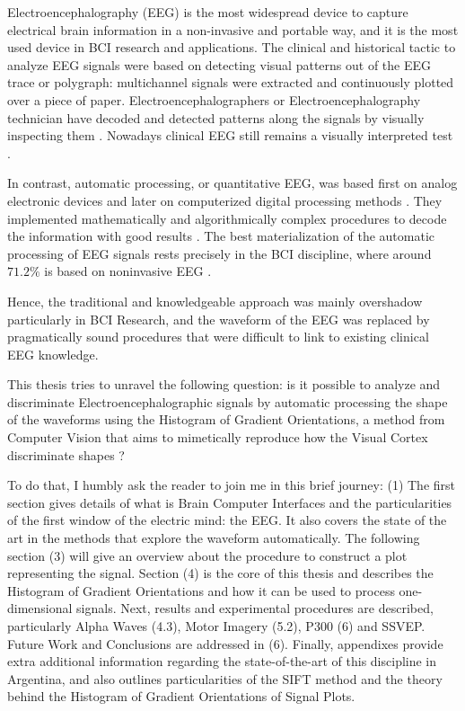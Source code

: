 Electroencephalography (EEG) is the most widespread device to capture electrical brain information in a non-invasive and portable way, and it is the most used device in BCI research and applications.  The clinical and historical tactic to analyze EEG signals were based on detecting visual patterns out of the EEG trace or polygraph\cite{Hartman2005}: multichannel signals were extracted and continuously plotted over a piece of paper. Electroencephalographers or Electroencephalography technician have decoded and detected patterns along the signals by visually inspecting them \cite{Schomer2010}.   Nowadays clinical EEG still remains a visually interpreted test \cite{Hartman2005}.

In contrast, automatic processing, or quantitative EEG, was based first on analog electronic devices and later on computerized digital processing methods \cite{Jansen1991}.  They implemented mathematically and algorithmically complex procedures to decode the information with good results \cite{Yuste2017}.  The best materialization of the automatic processing of EEG signals rests precisely in the BCI discipline, where around $71.2\%$ is based on noninvasive EEG \cite{Guger2017}.  


Hence, the traditional and knowledgeable approach was mainly overshadow particularly in BCI Research, and the waveform of the EEG was replaced by pragmatically sound procedures that were difficult to link to existing clinical EEG knowledge.  


This thesis tries to unravel the following question:  is it possible to analyze and discriminate Electroencephalographic signals by automatic processing the shape of the waveforms using the Histogram of Gradient Orientations, a method from Computer Vision that aims to mimetically reproduce how the Visual Cortex discriminate shapes ?

To do that, I humbly ask the reader to join me in this brief journey:  (1) The first section gives details of what is Brain Computer Interfaces and the particularities of the first window of the electric mind: the EEG. It also covers the state of the art in the methods that explore the waveform automatically.  The following section (3) will give an overview about the procedure to construct a plot representing the signal. Section (4) is the core of this thesis and describes the Histogram of Gradient Orientations and how it can be used to process one-dimensional signals.
Next, results and experimental procedures are described, particularly Alpha Waves (4.3), Motor Imagery (5.2), P300 (6) and SSVEP.  Future Work and Conclusions are addressed in (6).  Finally, appendixes provide extra additional information regarding the state-of-the-art of this discipline in Argentina, and also outlines particularities of the SIFT method and the theory behind the Histogram of Gradient Orientations of Signal Plots.

